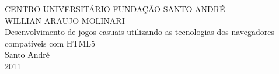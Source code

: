 \thispagestyle{empty}
\vspace{3cm}
\begin{center}
\large CENTRO UNIVERSITÁRIO FUNDAÇÃO SANTO ANDRÉ \\
\vspace{1cm}
\large WILLIAN ARAUJO MOLINARI \\
\vspace{8cm}
\huge Desenvolvimento de jogos casuais utilizando as tecnologias dos navegadores compatíveis com HTML5 \\
\vspace{8cm}
\large Santo André \\
\large 2011 \\
\end{center}
